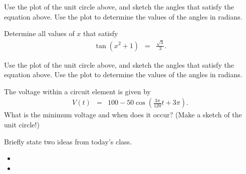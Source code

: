 \begin{problem}
  Use the plot of the unit circle above, and sketch the angles that
  satisfy the equation above. Use the plot to determine the values of
  the angles in radians.

  \vfill

  \clearpage

\item Determine all values of $x$ that satisfy
  \begin{eqnarray*}
    \tan(x^2+1) & = & \frac{\sqrt{3}}{3}.
  \end{eqnarray*}

  \begin{center}
  \end{center}
  Use the plot of the unit circle above, and sketch the angles that
  satisfy the equation above. Use the plot to determine the values of
  the angles in radians.

  \vfill

  \clearpage

\item The voltage within a circuit element is given by
  \begin{eqnarray*}
    V(t) & = & 100-50\cos\left( \frac{3\pi}{120} t + 3\pi \right).
  \end{eqnarray*}
  What is the minimum voltage and when does it occur? (Make a sketch
  of the unit circle!)

  \vfill

\end{problem}

\postClass

\begin{problem}
\item Briefly state two ideas from today's class.
  \begin{itemize}
  \item
  \item
  \end{itemize}
\item
  \begin{subproblem}
    \item
  \end{subproblem}
\end{problem}


